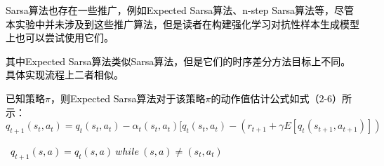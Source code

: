\textcolor{black}{Sarsa算法也存在一些推广，例如Expected Sarsa算法、n-step Sarsa算法等，尽管本实验中并未涉及到这些推广算法，但是读者在构建强化学习对抗性样本生成模型上也可以尝试使用它们。}

\textcolor{black}{其中Expected Sarsa算法类似Sarsa算法，但是它们的时序差分方法目标上不同。具体实现流程上二者相似。}

\textcolor{black}{已知策略$\pi$，则Expected Sarsa算法对于该策略$\pi$的动作值估计公式如式（2-6）所示：}
\begin{equation}
q_{t+1}(s_{t},a_{t})=q_{t}(s_{t},a_{t})-\alpha _{t}(s_{t},a_{t})[q_{t}(s_{t},a_{t})-(r_{t+1}+\gamma E[q_{t}(s_{t+1},a_{t+1})]) 
\end{equation}

\textcolor{black}{\ $q_{t+1}(s,a)=q_{t}(s,a) \ while \ (s,a) \neq (s_{t},a_{t})$}